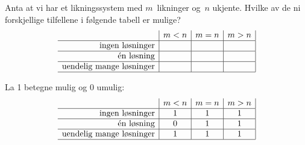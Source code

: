 \begin{losning}

\end{losning}


\begin{oppgave}
Anta at vi har et likningssystem med $m$~likninger og~$n$ ukjente.
Hvilke av de ni forskjellige tilfellene i følgende tabell er mulige?
\[
\begin{array}{r|c|c|c|}
                                & m < n & m = n & m > n \\ \hline
\text{ingen løsninger}          &       &       &       \\ \hline
\text{én løsning}               &       &       &       \\ \hline
\text{uendelig mange løsninger} &       &       &       \\ \hline
\end{array}
\]
\end{oppgave}

\begin{losning}

La 1 betegne mulig og 0 umulig:
\[
\begin{array}{r|c|c|c|}
& m < n & m = n & m > n \\ \hline
\text{ingen løsninger}          &   1   &   1   &   1   \\ \hline
\text{én løsning}               &   0   &   1   &   1   \\ \hline
\text{uendelig mange løsninger} &   1   &   1   &   1   \\ \hline
\end{array}
\]
\end{losning}


